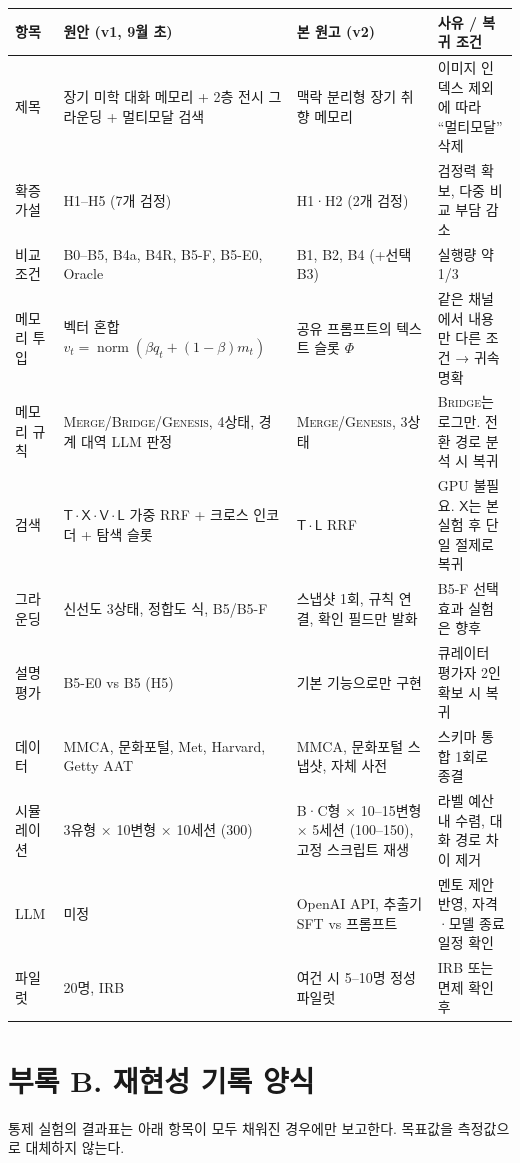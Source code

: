 \documentclass[10pt,twocolumn,letterpaper]{article}
\newcommand{\sT}{\mathsf{T}}
\newcommand{\sL}{\mathsf{L}}
\newcommand{\sX}{\mathsf{X}}
\newcommand{\sV}{\mathsf{V}}
\newcommand{\norm}{\operatorname{norm}}
\begin{document}
\begin{center}\small
\setlength{\tabcolsep}{5pt}
\renewcommand{\arraystretch}{1.15}
\begin{tabularx}{\textwidth}{@{}l>{\raggedright\arraybackslash}X>{\raggedright\arraybackslash}X>{\raggedright\arraybackslash}X@{}}
\toprule
항목 & 원안 (v1, 9월 초) & 본 원고 (v2) & 사유 / 복귀 조건 \\
\midrule
제목 & 장기 미학 대화 메모리 + 2층 전시 그라운딩 + 멀티모달 검색 & 맥락 분리형 장기 취향 메모리 & 이미지 인덱스 제외에 따라 ``멀티모달'' 삭제 \\
확증 가설 & H1–H5 (7개 검정) & H1·H2 (2개 검정) & 검정력 확보, 다중 비교 부담 감소 \\
비교 조건 & B0–B5, B4a, B4R, B5-F, B5-E0, Oracle & B1, B2, B4 (+선택 B3) & 실행량 약 1/3 \\
메모리 투입 & 벡터 혼합 $v_t=\norm(\beta q_t+(1-\beta)m_t)$ & 공유 프롬프트의 텍스트 슬롯 $\Phi$ & 같은 채널에서 내용만 다른 조건 → 귀속 명확 \\
메모리 규칙 & \textsc{Merge}/\textsc{Bridge}/\textsc{Genesis}, 4상태, 경계 대역 LLM 판정 & \textsc{Merge}/\textsc{Genesis}, 3상태 & \textsc{Bridge}는 로그만. 전환 경로 분석 시 복귀 \\
검색 & $\sT\cdot\sX\cdot\sV\cdot\sL$ 가중 RRF + 크로스 인코더 + 탐색 슬롯 & $\sT\cdot\sL$ RRF & GPU 불필요. $\sX$는 본실험 후 단일 절제로 복귀 \\
그라운딩 & 신선도 3상태, 정합도 식, B5/B5-F & 스냅샷 1회, 규칙 연결, 확인 필드만 발화 & B5-F 선택 효과 실험은 향후 \\
설명 평가 & B5-E0 vs B5 (H5) & 기본 기능으로만 구현 & 큐레이터 평가자 2인 확보 시 복귀 \\
데이터 & MMCA, 문화포털, Met, Harvard, Getty AAT & MMCA, 문화포털 스냅샷, 자체 사전 & 스키마 통합 1회로 종결 \\
시뮬레이션 & 3유형 × 10변형 × 10세션 (300) & B·C형 × 10–15변형 × 5세션 (100–150), 고정 스크립트 재생 & 라벨 예산 내 수렴, 대화 경로 차이 제거 \\
LLM & 미정 & OpenAI API, 추출기 SFT vs 프롬프트 & 멘토 제안 반영, 자격·모델 종료 일정 확인 \\
파일럿 & 20명, IRB & 여건 시 5–10명 정성 파일럿 & IRB 또는 면제 확인 후 \\
\bottomrule
\end{tabularx}
\end{center}

\section*{부록 B. 재현성 기록 양식}
통제 실험의 결과표는 아래 항목이 모두 채워진 경우에만 보고한다. 목표값을 측정값으로 대체하지 않는다.
\end{document}
